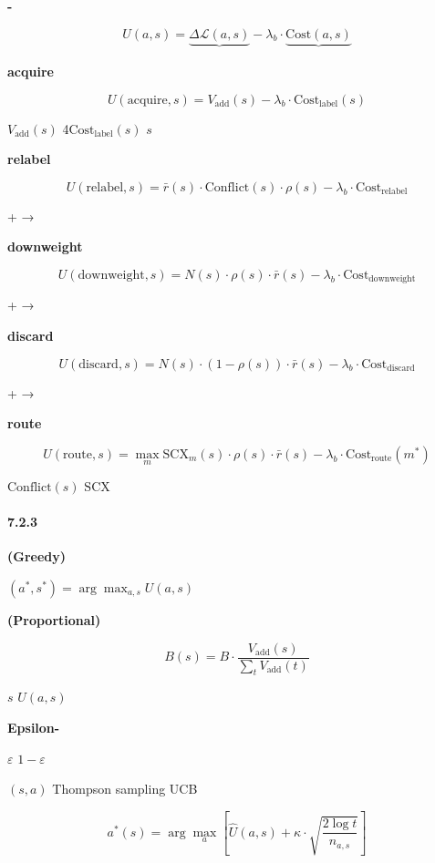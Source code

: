 \documentclass[
  12pt,
]{article}
\begin{document}
\textbf{-}

\[
U(a, s) = \underbrace{\Delta \mathcal{L}(a, s)}_{\text{}} - \lambda_b \cdot \underbrace{\text{Cost}(a, s)}_{\text{}}
\]



\textbf{acquire }

\[
U(\text{acquire}, s) = V_{\text{add}}(s) - \lambda_b \cdot \text{Cost}_{\text{label}}(s)
\]

 \(V_{\text{add}}(s)\)  4\(\text{Cost}_{\text{label}}(s)\)
 \(s\) 

\textbf{relabel }

\[
U(\text{relabel}, s) = \bar{r}(s) \cdot \text{Conflict}(s) \cdot \rho(s) - \lambda_b \cdot \text{Cost}_{\text{relabel}}
\]

 +  → 

\textbf{downweight }

\[
U(\text{downweight}, s) = N(s) \cdot \rho(s) \cdot \bar{r}(s) - \lambda_b \cdot \text{Cost}_{\text{downweight}}
\]

 +  → 

\textbf{discard }

\[
U(\text{discard}, s) = N(s) \cdot (1 - \rho(s)) \cdot \bar{r}(s) - \lambda_b \cdot \text{Cost}_{\text{discard}}
\]

 +  → 

\textbf{route }

\[
U(\text{route}, s) = \max_m \text{SCX}_m(s) \cdot \rho(s) \cdot \bar{r}(s) - \lambda_b \cdot \text{Cost}_{\text{route}}(m^*)
\]

 \(\text{Conflict}(s)\)  \(\text{SCX}\)


\paragraph{7.2.3
}\label{ux9884ux7b97ux5206ux914dux7b56ux7565}

\textbf{ (Greedy)}

 \((a^*, s^*) = \arg\max_{a,s} U(a, s)\)

\textbf{ (Proportional)}

\[
B(s) = B \cdot \frac{V_{\text{add}}(s)}{\sum_{t} V_{\text{add}}(t)}
\]

 \(s\)  \(U(a,s)\) 

\textbf{Epsilon-}

 \(\varepsilon\) 
\(1-\varepsilon\) 

\textbf{}

 \((s,a)\)  Thompson sampling  UCB

\[
a^*(s) = \arg\max_a \left[ \hat{U}(a,s) + \kappa \cdot \sqrt{\frac{2 \log t}{n_{a,s}}} \right]
\]
\end{document}
